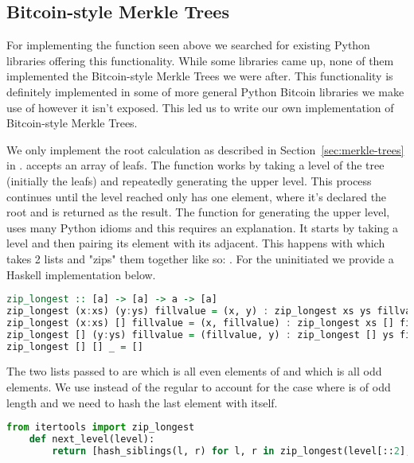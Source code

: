 \subsection{Bitcoin-style Merkle Trees}

For implementing the  function seen above we searched for existing Python libraries offering this functionality. While some libraries came up, none of them implemented the Bitcoin-style Merkle Trees we were after. This functionality is definitely implemented in some of more general Python Bitcoin libraries we make use of however it isn't exposed. This led us to write our own implementation of Bitcoin-style Merkle Trees.

We only implement the root calculation as described in Section~\ref{sec:merkle-trees} in .  accepts an array of leafs. The function works by taking a level of the tree (initially the leafs) and repeatedly generating the upper level. This process continues until the level reached only has one element, where it's declared the root and is returned as the result. The function for generating the upper level,  uses many Python idioms and this requires an explanation. It starts by taking a level and then pairing its element with its adjacent. This happens with  which takes 2 lists and "zips" them together like so: . For the uninitiated we provide a Haskell implementation below.

\begin{lstlisting}[language=Haskell]
zip_longest :: [a] -> [a] -> a -> [a]
zip_longest (x:xs) (y:ys) fillvalue = (x, y) : zip_longest xs ys fillvalue
zip_longest (x:xs) [] fillvalue = (x, fillvalue) : zip_longest xs [] fillvalue
zip_longest [] (y:ys) fillvalue = (fillvalue, y) : zip_longest [] ys fillvalue
zip_longest [] [] _ = []
\end{lstlisting}

The two lists passed to  are  which is all even elements of  and  which is all odd elements. We use  instead of the regular  to account for the case where  is of odd length and we need to hash the last element with itself.

\begin{lstlisting}[language=Python]
    from itertools import zip_longest
    def next_level(level):
        return [hash_siblings(l, r) for l, r in zip_longest(level[::2], level[1::2], fillvalue=level[-1])]
\end{lstlisting}

